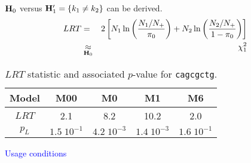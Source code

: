 \documentclass[dvips, lscape]{foils}
\newcommand{\Hbf}{{\bf H}}
\newcommand{\textblue}[1]{\textcolor{blue}{#1}}
\newcommand{\section}[1]{\centerline{\Large \textblue{#1}}}
\newcommand{\subsection}[1]{\noindent{\large \textblue{#1}}}
\begin{document}
$\Hbf_0$ versus $\Hbf'_1 = \{k_1 \neq k_2\}$ can be derived. 
\begin{eqnarray*}
LRT 
& = & 2\left[ N_1 \ln\left( \frac{N_1 / N_+}{\pi_0} \right) + N_2
  \ln\left( \frac{N_2 / N_+ }{1 - \pi_0} \right) \right] \\
& \underset{\Hbf_0}{\approx} & \chi^2_1
\end{eqnarray*}

\bigskip
\begin{table}[h]
  \begin{center}
    \begin{tabular}{ccccc}
      Model          & M00 & M0 & M1 & M6  \\
      \hline
      $LRT$ &  2.1 & 8.2 & 10.2 & 2.0 \\
      $p_L$ & $1.5\;10^{-1}$ & $4.2\;10^{-3}$ & $1.4\;10^{-3}$ &
      $1.6\;10^{-1}$ \\
    \end{tabular}
    \caption{$LRT$ statistic and associated $p$-value for {\tt cagcgctg}.}
    \label{Tab:EN-cagcgctg}
  \end{center}
\end{table}

\newpage
\section{Usage conditions}

\subsection{LRT Distribution}
\end{document}
